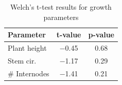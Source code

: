 \begin{table}[htbp]
    \caption{Welch's t-test results for growth parameters}
    \label{tab:ttest_results}
    \begin{tabularx}{\linewidth}{lcc}
        \toprule
        \textbf{Parameter} & \textbf{t-value} & \textbf{p-value} \\
        \midrule
        Plant height & \num[mode=text]{-0.45} & \num[mode=text]{0.68} \\
        Stem cir. & \num[mode=text]{-1.17} & \num[mode=text]{0.29} \\
        \# Internodes & \num[mode=text]{-1.41} & \num[mode=text]{0.21} \\
        \bottomrule
    \end{tabularx}
\end{table}

